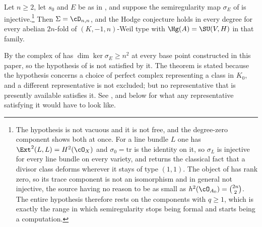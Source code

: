 \begin{theorem}
\label{thm:semiregclosure}
Let $n\ge2$, let $s_{0}$ and $E$ be as in , and suppose the
semiregularity map $\sigma_{E}$ of  is
injective.\footnote{The hypothesis is not vacuous and it is not free, and the
degree-zero component shows both at once. For a line bundle $L$ one has
$\Ext^{2}(L,L)=H^{2}(\cO_{X})$ and $\sigma_{0}=\mathrm{tr}$ is the identity
on it, so $\sigma_{L}$ is injective for every line bundle on every variety,
and  returns the classical fact that a divisor class deforms
wherever it stays of type $(1,1)$. The object of  has rank
zero, so its trace component is not an isomorphism and in general not
injective, the source having no reason to be as small as
$h^{2}(\cO_{A_{0}})=\binom{2n}{2}$. The entire hypothesis therefore rests on
the components with $q\ge1$, which is exactly the range in which
semiregularity stops being formal and starts being a computation.} Then
$\Sigma=\cD_{n,n}$, and the Hodge conjecture holds in every degree for every
abelian $2n$-fold of $(K,-1,n)$-Weil type with $\Hg(A)=\SU(V,H)$ in that
family.
\end{theorem}

\begin{remark}
\label{rem:semiregunavailable}
By  the complex of  has
$\dim\ker\sigma_{E}\ge n^{2}$ at every base point constructed in this paper,
so the hypothesis of  is not satisfied by it. The
theorem is stated because the hypothesis concerns a choice of perfect complex
representing a class in $K_{0}$, and a different representative is not
excluded; but no representative that is presently available satisfies it. See
, and  below for what any
representative satisfying it would have to look like.
\end{remark}


